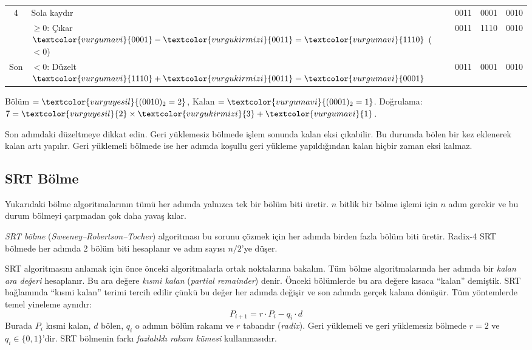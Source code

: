 \begin{ornek}[5.13]
\begin{center}
{\begin{tabular}{c l c c c}
\midrule
4 & Sola kaydır & \textcolor{vurgukirmizi}{0011} & \textcolor{vurgumavi}{0001} & \textcolor{vurguyesil}{0010} \\
  & $\geq 0$: Çıkar $\textcolor{vurgumavi}{0001} - \textcolor{vurgukirmizi}{0011} = \textcolor{vurgumavi}{1110}$ ($<0$) & \textcolor{vurgukirmizi}{0011} & \textcolor{vurgumavi}{1110} & \textcolor{vurguyesil}{0010} \\
\midrule
Son & $< 0$: Düzelt $\textcolor{vurgumavi}{1110} + \textcolor{vurgukirmizi}{0011} = \textcolor{vurgumavi}{0001}$ & \textcolor{vurgukirmizi}{0011} & \textcolor{vurgumavi}{0001} & \textcolor{vurguyesil}{0010} \\
\bottomrule
\end{tabular}}%
\end{center}

Bölüm $= \textcolor{vurguyesil}{(0010)_2 = 2}$, \quad Kalan $= \textcolor{vurgumavi}{(0001)_2 = 1}$. Doğrulama: $7 = \textcolor{vurguyesil}{2} \times \textcolor{vurgukirmizi}{3} + \textcolor{vurgumavi}{1}$.\;\checkmark

Son adımdaki düzeltmeye dikkat edin. Geri yüklemesiz bölmede işlem sonunda kalan eksi çıkabilir. Bu durumda bölen bir kez eklenerek kalan artı yapılır. Geri yüklemeli bölmede ise her adımda koşullu geri yükleme yapıldığından kalan hiçbir zaman eksi kalmaz.
\end{ornek}

\subsection{SRT Bölme}
\label{sec:srt-bolme}

Yukarıdaki bölme algoritmalarının tümü her adımda yalnızca tek bir bölüm biti üretir. $n$ bitlik bir bölme işlemi için $n$ adım gerekir ve bu durum bölmeyi çarpmadan çok daha yavaş kılar.

\emph{SRT bölme} (\emph{Sweeney--Robertson--Tocher}) algoritması bu sorunu çözmek için her adımda birden fazla bölüm biti üretir. Radix-4 SRT bölmede her adımda 2 bölüm biti hesaplanır ve adım sayısı $n/2$'ye düşer.

SRT algoritmasını anlamak için önce önceki algoritmalarla ortak noktalarına bakalım. Tüm bölme algoritmalarında her adımda bir \emph{kalan ara değeri} hesaplanır. Bu ara değere \emph{kısmi kalan} (\emph{partial remainder}) denir. Önceki bölümlerde bu ara değere kısaca ``kalan'' demiştik. SRT bağlamında ``kısmi kalan'' terimi tercih edilir çünkü bu değer her adımda değişir ve son adımda gerçek kalana dönüşür. Tüm yöntemlerde temel yineleme aynıdır:
\[
P_{i+1} = r \cdot P_i - q_i \cdot d
\]
Burada $P_i$ kısmi kalan, $d$ bölen, $q_i$ o adımın bölüm rakamı ve $r$ tabandır (\emph{radix}). Geri yüklemeli ve geri yüklemesiz bölmede $r = 2$ ve $q_i \in \{0, 1\}$'dir. SRT bölmenin farkı \emph{fazlalıklı rakam kümesi} kullanmasıdır.

